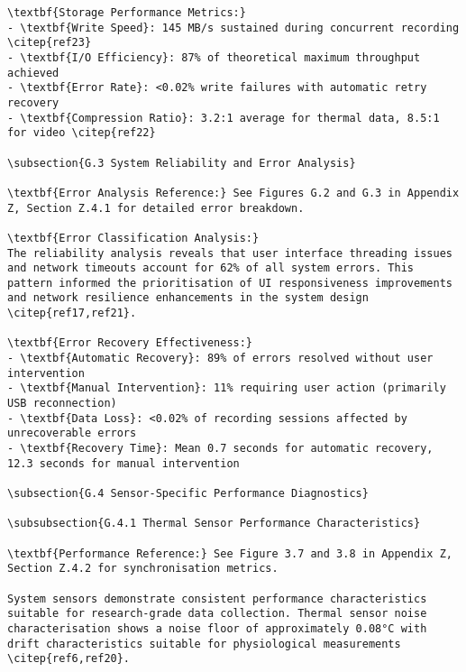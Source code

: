 \begin{verbatim}
\textbf{Storage Performance Metrics:}
- \textbf{Write Speed}: 145 MB/s sustained during concurrent recording \citep{ref23}
- \textbf{I/O Efficiency}: 87% of theoretical maximum throughput achieved
- \textbf{Error Rate}: <0.02% write failures with automatic retry recovery
- \textbf{Compression Ratio}: 3.2:1 average for thermal data, 8.5:1 for video \citep{ref22}

\subsection{G.3 System Reliability and Error Analysis}

\textbf{Error Analysis Reference:} See Figures G.2 and G.3 in Appendix Z, Section Z.4.1 for detailed error breakdown.

\textbf{Error Classification Analysis:}
The reliability analysis reveals that user interface threading issues and network timeouts account for 62% of all system errors. This pattern informed the prioritisation of UI responsiveness improvements and network resilience enhancements in the system design \citep{ref17,ref21}.

\textbf{Error Recovery Effectiveness:}
- \textbf{Automatic Recovery}: 89% of errors resolved without user intervention
- \textbf{Manual Intervention}: 11% requiring user action (primarily USB reconnection)
- \textbf{Data Loss}: <0.02% of recording sessions affected by unrecoverable errors
- \textbf{Recovery Time}: Mean 0.7 seconds for automatic recovery, 12.3 seconds for manual intervention

\subsection{G.4 Sensor-Specific Performance Diagnostics}

\subsubsection{G.4.1 Thermal Sensor Performance Characteristics}

\textbf{Performance Reference:} See Figure 3.7 and 3.8 in Appendix Z, Section Z.4.2 for synchronisation metrics.

System sensors demonstrate consistent performance characteristics suitable for research-grade data collection. Thermal sensor noise characterisation shows a noise floor of approximately 0.08°C with drift characteristics suitable for physiological measurements \citep{ref6,ref20}.


\end{verbatim}
